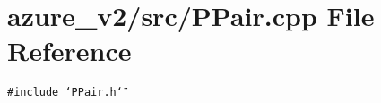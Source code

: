 \section{azure\_\-v2/src/PPair.cpp File Reference}
\label{PPair_8cpp}
{\tt \#include \char`\"{}PPair.h\char`\"{}}\par
